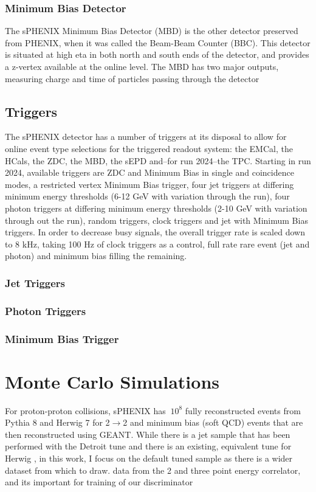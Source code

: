 	\subsection{Minimum Bias Detector}
	The sPHENIX Minimum Bias Detector (MBD) is the other detector preserved from PHENIX, when it was called the Beam-Beam Counter (BBC). 
	This detector is situated at high eta %
	in both north and south ends of the detector, and provides a z-vertex available at the online level. 
	The MBD has two major outputs, measuring charge and time of particles passing through the detector
\section{Triggers}
	The sPHENIX detector has a number of triggers at its disposal to allow for online event type selections for the triggered readout system: the EMCal, the HCals, the ZDC, the MBD, the sEPD and--for run 2024--the TPC.
	Starting in run 2024, available triggers are ZDC and Minimum Bias in single and coincidence modes, a restricted vertex Minimum Bias trigger, four jet triggers at differing minimum energy thresholds (6-12 GeV with variation through the run), four photon triggers at differing minimum energy thresholds (2-10 GeV with variation through out the run), random triggers, clock triggers and jet with Minimum Bias triggers. 
	In order to decrease busy signals, the overall trigger rate is scaled down to 8 kHz, taking 100 Hz of clock triggers as a control, full rate rare event (jet and photon) and minimum bias filling the remaining. 
	\subsection{Jet Triggers}
	\subsection{Photon Triggers}
	\subsection{Minimum Bias Trigger}
\chapter{Monte Carlo Simulations}
	For proton-proton collisions, sPHENIX has $~10^8$ fully reconstructed events from Pythia 8 and Herwig 7 for 2$\rightarrow$2 and minimum bias (soft QCD) events that are then reconstructed using GEANT. 
	While there is a jet sample that has been performed with the Detroit tune \cite{Detroit_tune} and there is an existing, equivalent tune for Herwig \cite{New_Haven_Vanderbilt_tune}, in this work, I focus on the default tuned sample as there is a wider dataset from which to draw. 
	data from the 2 and three point energy correlator, and its important for training of our discriminator 
